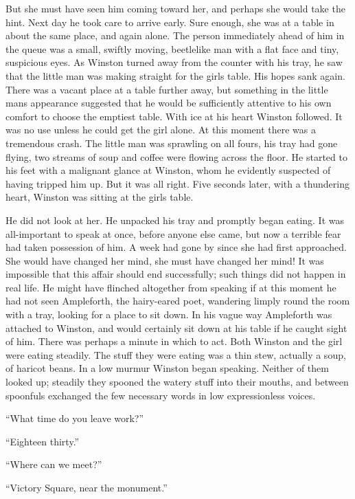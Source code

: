 But she must have seen him coming toward her, and perhaps she would take
the hint. Next day he took care to arrive early. Sure enough, she was at
a table in about the same place, and again alone. The person immediately
ahead of him in the queue was a small, swiftly moving, beetlelike man
with a flat face and tiny, suspicious eyes. As Winston turned away from
the counter with his tray, he saw that the little man was making
straight for the girl\textquotesingle s table. His hopes sank again.
There was a vacant place at a table further away, but something in the
little man\textquotesingle s appearance suggested that he would be
sufficiently attentive to his own comfort to choose the emptiest table.
With ice at his heart Winston followed. It was no use unless he could
get the girl alone. At this moment there was a tremendous crash. The
little man was sprawling on all fours, his tray had gone flying, two
streams of soup and coffee were flowing across the floor. He started to
his feet with a malignant glance at Winston, whom he evidently suspected
of having tripped him up. But it was all right. Five seconds later, with
a thundering heart, Winston was sitting at the girl\textquotesingle s
table.

He did not look at her. He unpacked his tray and promptly began eating.
It was all-important to speak at once, before anyone else came, but now
a terrible fear had taken possession of him. A week had gone by since
she had first approached. She would have changed her mind, she must have
changed her mind! It was impossible that this affair should end
successfully; such things did not happen in real life. He might have
flinched altogether from speaking if at this moment he had not seen
Ampleforth, the hairy-eared poet, wandering limply round the room with a
tray, looking for a place to sit down. In his vague way Ampleforth was
attached to Winston, and would certainly sit down at his table if he
caught sight of him. There was perhaps a minute in which to act. Both
Winston and the girl were eating steadily. The stuff they were eating
was a thin stew, actually a soup, of haricot beans. In a low murmur
Winston began speaking. Neither of them looked up; steadily they spooned
the watery stuff into their mouths, and between spoonfuls exchanged the
few necessary words in low expressionless voices.

``What time do you leave work?''

``Eighteen thirty.''

``Where can we meet?''

``Victory Square, near the monument.''

